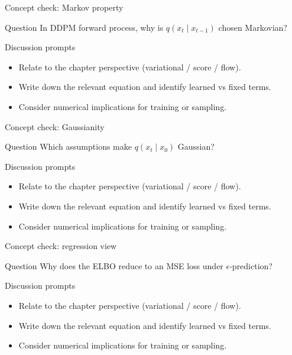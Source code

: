 \documentclass[aspectratio=169]{beamer}
\begin{document}
\begin{frame}{Concept check: Markov property}
\begin{block}{Question}
In DDPM forward process, why is \(q(x_t\mid x_{t-1})\) chosen Markovian?
\end{block}
\begin{block}{Discussion prompts}
\begin{itemize}
\item Relate to the chapter perspective (variational / score / flow).
\item Write down the relevant equation and identify learned vs fixed terms.
\item Consider numerical implications for training or sampling.
\end{itemize}
\end{block}
\end{frame}

\begin{frame}{Concept check: Gaussianity}
\begin{block}{Question}
Which assumptions make \(q(x_t\mid x_0)\) Gaussian?
\end{block}
\begin{block}{Discussion prompts}
\begin{itemize}
\item Relate to the chapter perspective (variational / score / flow).
\item Write down the relevant equation and identify learned vs fixed terms.
\item Consider numerical implications for training or sampling.
\end{itemize}
\end{block}
\end{frame}

\begin{frame}{Concept check: regression view}
\begin{block}{Question}
Why does the ELBO reduce to an MSE loss under \(\epsilon\)-prediction?
\end{block}
\begin{block}{Discussion prompts}
\begin{itemize}
\item Relate to the chapter perspective (variational / score / flow).
\item Write down the relevant equation and identify learned vs fixed terms.
\item Consider numerical implications for training or sampling.
\end{itemize}
\end{block}
\end{frame}
\end{document}

